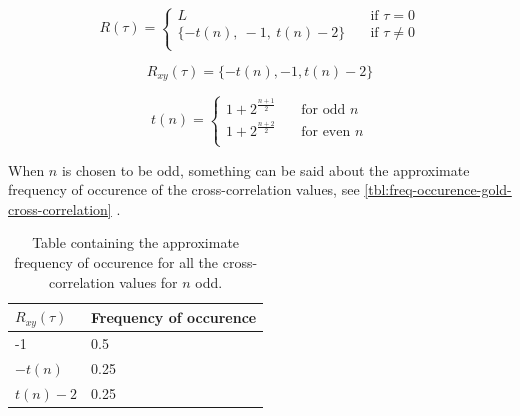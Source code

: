 		\begin{equation}
			\label{eq:autocorr-gold}
			R(\tau) = 
				\begin{cases}
					L    							& \quad \text{if } \tau = 0 \\
					\{ -t(n), \ -1, \ t(n) - 2  \} 	& \quad \text{if } \tau \neq 0 \\
				\end{cases}
		\end{equation}

		\begin{equation}
			\label{eq:corsscorr-gold}
			R_{xy}(\tau) = 	\{ -t(n), -1, t(n) - 2  \} 
		\end{equation}

		\begin{equation}
			\label{eq:gold-t(n)}
			t(n) = 
				\begin{cases}
					1 + 2^{\frac{n+1}{2}} & \quad \text{for odd } n \\
					1 + 2^{\frac{n+2}{2}} & \quad \text{for even } n \\
				\end{cases}
		\end{equation}

		When $n$ is chosen to be odd, something can be said about the approximate frequency of occurence of the cross-correlation values, see \autoref{tbl:freq-occurence-gold-cross-correlation} \cite{holmes2007spread}.

		\begin{table}[h]
			\centering
			\begin{tabular}{ | l | l | }

				\hline
				$R_{xy}(\tau)$ 	& Frequency of occurence	\\ \hline

				-1				& 0.5					 	\\ \hline
				$-t(n)$			& 0.25						\\ \hline
				$t(n) - 2$		& 0.25						\\ \hline

				

			\end{tabular}
			\caption{Table containing the approximate frequency of occurence for all the cross-correlation values for $n$ odd.}
			\label{tbl:freq-occurence-gold-cross-correlation}
		\end{table}

		



